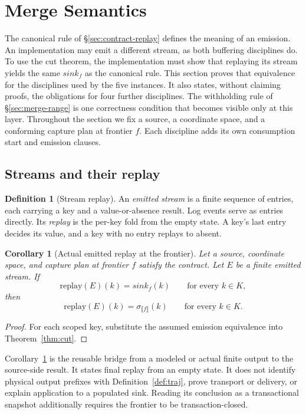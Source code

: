 \documentclass[sigconf,nonacm,10pt]{acmart}
\theoremstyle{plain}
\newtheorem{corollary}{Corollary}
\theoremstyle{definition}
\newtheorem{definition}{Definition}[section]
\newcommand{\den}[1]{\llbracket #1 \rrbracket}   %
\newcommand{\sink}{\mathit{sink}}                %
\newcommand{\keys}{K}                            %
\begin{document}
\section{Merge Semantics}\label{sec:merge}

The canonical rule of \S\ref{sec:contract-replay} defines the
meaning of an emission. An implementation may emit a different
stream, as both buffering disciplines do. To use the cut theorem,
the implementation must show that replaying its stream yields the
same $\sink_f$ as the canonical rule. This section proves that
equivalence for the disciplines used by the five instances. It
also states, without claiming proofs, the obligations for four
further disciplines. The withholding rule of
\S\ref{sec:merge-range} is one correctness condition that becomes
visible only at this layer. Throughout the section we fix a source,
a coordinate space, and a conforming capture plan at frontier $f$.
Each discipline adds its own consumption start and emission clauses.

\subsection{Streams and their replay}\label{sec:merge-streams}

\begin{definition}[Stream replay]\label{def:stream}
An \emph{emitted stream} is a finite sequence of entries, each
carrying a key and a value-or-absence result. Log events serve as
entries directly. Its \emph{replay} is the per-key fold from the
empty state. A key's last entry decides its value, and a key with
no entry replays to absent.
\end{definition}

\begin{corollary}[Actual emitted replay at the frontier]
\label{cor:emitted-cut}
Let a source, coordinate space, and capture plan at frontier $f$
satisfy the contract. Let $E$ be a finite emitted stream. If
\[
\mathrm{replay}(E)(k)=\sink_f(k)
\qquad\text{for every }k\in\keys,
\]
then
\[
\mathrm{replay}(E)(k)=\sigma_{\den{f}}(k)
\qquad\text{for every }k\in\keys.
\]
\end{corollary}

\begin{proof}
For each scoped key, substitute the assumed emission equivalence into
Theorem~\ref{thm:cut}.
\end{proof}

Corollary~\ref{cor:emitted-cut} is the reusable bridge from a modeled
or actual finite output to the source-side result. It states final
replay from an empty state. It does not identify physical output
prefixes with Definition~\ref{def:traj}, prove transport or delivery,
or explain application to a populated sink. Reading its conclusion as
a transactional snapshot additionally requires the frontier to be
transaction-closed.
\end{document}

